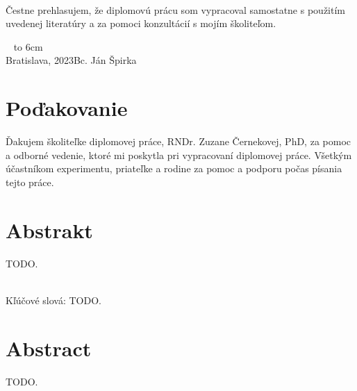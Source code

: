 \documentclass[12pt, a4paper, oneside]{book}
\newcommand\mfauthor{Bc. Ján Špirka}
\newcommand\mfplacedate{Bratislava, 2023}
\begin{document}
\noindent
\begin{minipage}{0.25\textwidth}~\end{minipage}
\begin{minipage}{0.75\textwidth}
Čestne prehlasujem, že diplomovú prácu som vypracoval samostatne s použitím uvedenej literatúry a za pomoci konzultácií s mojím školiteľom.
\newline \newline
\end{minipage}
\vfill
~ \hfill {\hbox to 6cm{\dotfill}} \\
\mfplacedate \hfill \mfauthor
\vfill\eject 



\chapter*{Poďakovanie}\label{chap:thank_you}
Ďakujem školiteľke diplomovej práce, RNDr. Zuzane Černekovej, PhD, za pomoc a odborné vedenie, ktoré mi poskytla pri vypracovaní  diplomovej práce. Všetkým účastníkom experimentu, priateľke a rodine za pomoc a podporu počas písania tejto práce.
\vfill\eject 





\chapter*{Abstrakt}\label{chap:abstract_sk}
TODO.

~\\
Kľúčové slová: TODO.
\vfill\eject 



\chapter*{Abstract}\label{chap:abstract_en}
TODO.
\end{document}

